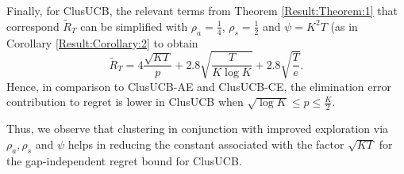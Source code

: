Finally, for ClusUCB, the relevant terms from Theorem \ref{Result:Theorem:1} that correspond $\tilde R_T$ 
can be simplified with $\rho_{a}=\frac{1}{4}$, $\rho_{s}=\frac{1}{2}$ and $\psi=K^{2}T$ (as in Corollary \ref{Result:Corollary:2} to obtain  
$$\tilde R_T = 4\dfrac{\sqrt{KT}}{p} + 2.8\sqrt{\dfrac{T}{K\log K}} + 2.8\sqrt{\dfrac{T}{e}}.$$ 
Hence, in comparison to ClusUCB-AE and ClusUCB-CE, the elimination error contribution to regret is lower in ClusUCB when $\sqrt{\log K}\leq p\leq \frac{K}{2}$. 
 
Thus, we observe that clustering in conjunction with improved exploration via $\rho_{a},\rho_{s}$ and $\psi$ helps in reducing the constant associated with the factor $\sqrt{KT}$ for the gap-independent regret bound for ClusUCB.
